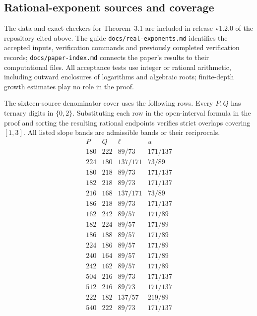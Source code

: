 \documentclass[11pt,a4paper]{article}
\begin{document}
\subsection{Rational-exponent sources and coverage}\label{app:real-certificates}
The data and exact checkers for Theorem~3.1
are included in release v1.2.0 of the repository cited above.
The guide \nolinkurl{docs/real-exponents.md} identifies the accepted
inputs, verification commands and previously completed verification
records; \nolinkurl{docs/paper-index.md} connects the paper's results
to their computational files. All acceptance tests use integer or rational
arithmetic, including outward enclosures of logarithms and algebraic
roots; finite-depth growth estimates play no role in the proof.

The sixteen-source denominator cover uses the following rows.
Every \(P,Q\) has ternary digits in \(\{0,2\}\). Substituting each
row in the open-interval formula in the proof and sorting the resulting
rational endpoints verifies strict overlaps covering \([1,3]\).
All listed slope bands are admissible bands or their reciprocals.
\[
\begin{array}{rr|cc}
P&Q&\ell&u\\ \hline
180&222&89/73&171/137\\
224&180&137/171&73/89\\
180&218&89/73&171/137\\
182&218&89/73&171/137\\
216&168&137/171&73/89\\
186&218&89/73&171/137\\
162&242&89/57&171/89\\
182&224&89/57&171/89\\
186&188&89/57&171/89\\
224&186&89/57&171/89\\
240&164&89/57&171/89\\
242&162&89/57&171/89\\
504&216&89/73&171/137\\
512&216&89/73&171/137\\
222&182&137/57&219/89\\
540&222&89/73&171/137\\
\end{array}
\]
\end{document}
